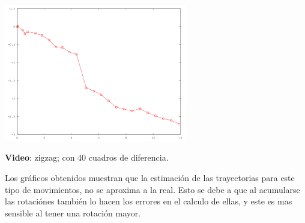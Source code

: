 \documentclass[10pt, a4paper,english,spanish,hidelinks]{article}
\begin{document}
\centerline{ }
\centerline{\includegraphics[width=0.6\textwidth]{./img/zigzag-40.png}}
\centerline{\textbf{Video}: zigzag; con 40 cuadros de diferencia.}

Los gráficos obtenidos muestran que la estimación de las trayectorias para este tipo de movimientos, no se aproxima a la real.
Esto se debe a que al acumularse las rotaciónes también lo hacen los errores en el calculo de ellas, y este es mas sensible al tener una rotación mayor.
\end{document}
